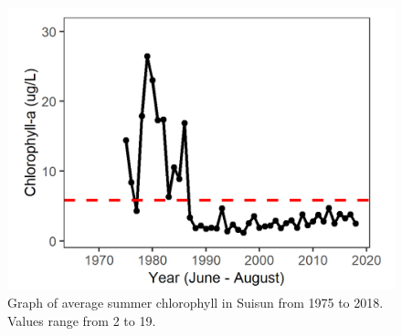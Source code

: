 \documentclass[
]{book}
\begin{document}
\begin{panel-grid}
\begin{columns-nocenter}
\begin{column800}
\begin{expand}
\end{expand}

\end{column800}

\begin{column40}

~

\end{column40}

\begin{column800}

\begin{expand}

\begin{figure}
\includegraphics[width=15.25in]{figures/chla_sssummer} \caption{Graph of average summer chlorophyll in Suisun from 1975 to 2018. Values range from 2 to 19.}\label{fig:unnamed-chunk-64}
\end{figure}

\end{expand}

\end{column800}

\begin{column40}

~

\end{column40}

\begin{column800}

\begin{expand}


\end{expand}
\end{column800}
\end{columns-nocenter}
\end{panel-grid}
\end{document}
